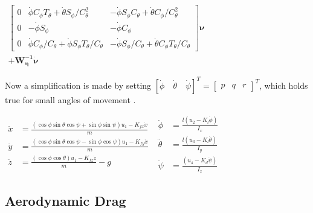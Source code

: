 $
\begin{array}{c}
\left[ \begin{array}{cccc}{0} & {\dot{\phi} C_{\phi} T_{\theta}+\dot{\theta} S_{\phi} / C_{\theta}^{2}} & {-\dot{\phi} S_{\phi} C_{\theta}+\dot{\theta} C_{\phi} / C_{\theta}^{2}} \\ {0} & {-\dot{\phi} S_{\phi}} & {-\dot{\phi} C_{\phi}} \\ {0} & {\dot{\phi} C_{\phi} / C_{\theta}+\dot{\phi} S_{\phi} T_{\theta} / C_{\theta}} & {-\dot{\phi} S_{\phi} / C_{\theta}+\dot{\theta} C_{\phi} T_{\theta} / C_{\theta}}\end{array}\right] \boldsymbol{\nu}
\\ + \boldsymbol{W_{\eta}^{-1} \dot{\nu}}
\end{array}
  $

Now a simplification is made by setting $[\dot{\phi} \quad \dot{\theta} \quad \dot{\psi}]^{T}=\left[ \begin{array}{lll}{p} & {q} & {r}\end{array}\right]^{T}$, which holds true for small angles of movement \cite{Sabatino}.

$\begin{aligned} \ddot{x} &=\frac{(\cos \phi \sin \theta \cos \psi+\sin \phi \sin \psi) u_{1}-K_{f x} \dot{x}}{m} \\ \ddot{y} &=\frac{(\cos \phi \sin \theta \cos \psi-\sin \phi \cos \psi) u_{1}-K_{f y} \dot{x}}{m} \\ \ddot{z} &=\frac{(\cos \phi \cos \theta) u_{1}-K_{f z} \dot{z}}{m}-g \end{aligned}$
$\begin{aligned} \ddot{\phi} &=\frac{l\left(u_{2}-K_{l} \dot{\phi}\right)}{I_{x}} \\ \ddot{\theta} &=\frac{l\left(u_{3}-K_{l} \dot{\theta}\right)}{I_{y}} \\ \ddot{\psi} &=\frac{\left(u_{4}-K_{d} \dot{\psi}\right)}{I_{z}} \end{aligned}$

\subsection{Aerodynamic Drag}

